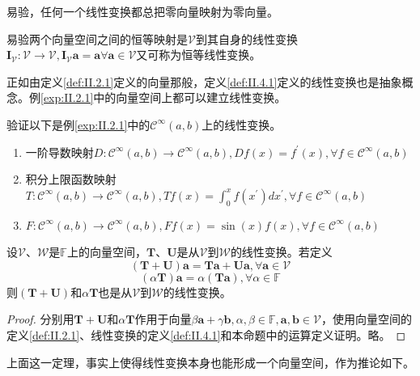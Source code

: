 \documentclass[main.tex]{subfiles}
\begin{document}
易验，任何一个线性变换都总把零向量映射为零向量。

易验两个向量空间之间的恒等映射是$\mathcal{V}$到其自身的线性变换$\mathbf{I}_\mathcal{V}:\mathcal{V}\rightarrow\mathcal{V},\mathbf{I}_\mathcal{V}\mathbf{a}=\mathbf{a}\forall\mathbf{a}\in\mathcal{V}$又可称为恒等线性变换。

正如由定义\ref{def:II.2.1}定义的向量那般，定义\ref{def:II.4.1}定义的线性变换也是抽象概念。例\ref{exp:II.2.1}中的向量空间上都可以建立线性变换。

\begin{example}\label{exp:II.4.2}
验证以下是例\ref{exp:II.2.1}中的$\mathcal{C}^\infty\left(a,b\right)$上的线性变换。
\begin{enumerate}
    \item 一阶导数映射$D:\mathcal{C}^\infty\left(a,b\right)\rightarrow\mathcal{C}^\infty\left(a,b\right),Df\left(x\right)=f^\prime\left(x\right),\forall f\in\mathcal{C}^\infty\left(a,b\right)$
    \item 积分上限函数映射$T:\mathcal{C}^\infty\left(a,b\right)\rightarrow\mathcal{C}^\infty\left(a,b\right),Tf\left(x\right)=\int_{0}^xf\left(x^\prime\right)dx^\prime,\forall f\in\mathcal{C}^\infty\left(a,b\right)$
    \item $F:\mathcal{C}^\infty\left(a,b\right)\rightarrow\mathcal{C}^\infty\left(a,b\right),Ff\left(x\right)=\sin\left(x\right)f\left(x\right),\forall f\in\mathcal{C}^\infty\left(a,b\right)$
\end{enumerate}
\end{example}

\begin{theorem}\label{thm:II.4.1}
设$\mathcal{V}$、$\mathcal{W}$是$\mathbb{F}$上的向量空间，$\mathbf{T}$、$\mathbf{U}$是从$\mathcal{V}$到$\mathcal{W}$的线性变换。若定义
\[\left(\mathbf{T}+\mathbf{U}\right)\mathbf{a}=\mathbf{Ta}+\mathbf{Ua},\forall\mathbf{a}\in\mathcal{V}\]
\[\left(\alpha\mathbf{T}\right)\mathbf{a}=\alpha\left(\mathbf{Ta}\right),\forall\alpha\in\mathbb{F}\]
则$\left(\mathbf{T}+\mathbf{U}\right)$和$\alpha\mathbf{T}$也是从$\mathcal{V}$到$\mathcal{W}$的线性变换。
\end{theorem}
\begin{proof}
分别用$\mathbf{T}+\mathbf{U}$和$\alpha\mathbf{T}$作用于向量$\beta\mathbf{a}+\gamma\mathbf{b},\alpha,\beta\in\mathbb{F},\mathbf{a},\mathbf{b}\in\mathcal{V}$，使用向量空间的定义\ref{def:II.2.1}、线性变换的定义\ref{def:II.4.1}和本命题中的运算定义证明。略。
\end{proof}

上面这一定理，事实上使得线性变换本身也能形成一个向量空间，作为推论如下。
\end{document}
